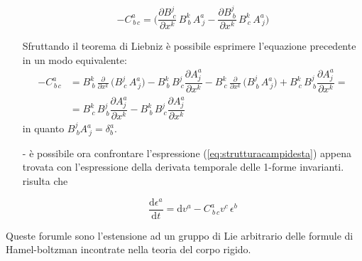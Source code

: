 \begin{itemize}
\begin{displaymath}
-C^{a}_{\,b\,c} = \Bigr( \dfrac{\partial B^{j}_{\: c}}{\partial x^{k}}\, B^{k}_{\: b} \, A^{a}_{\: j} - \dfrac{\partial B^{j}_{\: b}}{\partial x^{k}}\, B^{k}_{\: c} \, A^{a}_{\: j} \Bigr)
\end{displaymath}

Sfruttando il teorema di Liebniz è possibile esprimere l'equazione precedente in un modo equivalente:
\begin{equation}\begin{split}
\label{eq:strutturacampidesta}
-C^{a}_{\,b\,c} &= 
B^{k}_{\: b} \,  \frac{\partial }{\partial x^{k}}\, \bigr( B^{j}_{\: c} \, A^{a}_{\: j} \bigr)- B^{k}_{\: b}\, B^{j}_{\: c} \dfrac{\partial A^{a}_{j}}{\partial x^{k}} - 
B^{k}_{\: c} \,\frac{\partial }{\partial x^{k}}\,\bigr(B^{j}_{\: b} \,  A^{a}_{\: j}\bigr)  
+ B^{k}_{\: c}\, B^{j}_{\: b} \dfrac{\partial A^{a}_{j}}{\partial x^{k}} = \\ &=
B^{k}_{\: c}\, B^{j}_{\: b} \dfrac{\partial A^{a}_{j}}{\partial x^{k}} - B^{k}_{\: b}\, B^{j}_{\: c} \dfrac{\partial A^{a}_{j}}{\partial x^{k}}
\end{split}\end{equation}
in quanto $B^{j}_{\: b}A^{a}_{\: j}= \delta^{a}_{b}$.


\item[-] è possibile ora confrontare l'espressione (\ref{eq:strutturacampidesta}) appena trovata con l'espressione della derivata temporale delle 1-forme invarianti. risulta che

\begin{equation}
\dfrac{\textrm{d}\epsilon^{a}}{\textrm{d}t} = \textrm{d}v^{a} - C^{a}_{\: b \, c}v^{c}\,\epsilon^{b}
\end{equation}
\end{itemize}

Queste forumle sono l'estensione ad un gruppo di Lie arbitrario delle formule di Hamel-boltzman incontrate nella teoria del corpo rigido.
